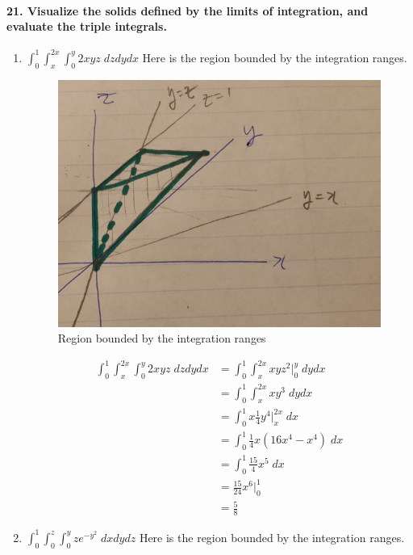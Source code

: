 \documentclass{article}
\begin{document}
\paragraph{21. Visualize the solids defined by the limits of integration, and evaluate the triple integrals.}
    \begin{enumerate}
        \item $\int_0^1 \int_x^{2x} \int_0^y 2xyz \; dz dy dx$
        \newline Here is the region bounded by the integration ranges.
        
        
        \begin{figure}[H]
            \centering
            \includegraphics[width=0.75\columnwidth]{num21_1.JPG}
            \caption{Region bounded by the integration ranges}
            \label{fig:my_label}
        \end{figure}
\begin{align*}
    \int_0^1 \int_x^{2x} \int_0^y 2xyz \; dz dy dx &= \int_0^1 \int_x^{2x} xyz^2 \Bigr|_{0}^{y} \; dy dx \\
    &= \int_0^1 \int_x^{2x} xy^3 \; dy dx \\
    &= \int_0^1 x\frac{1}{4}y^4 \Bigr|_{x}^{2x} \; dx \\
    &= \int_0^1 \frac{1}{4}x(16x^4-x^4) \; dx\\
    &= \int_0^1 \frac{15}{4}x^5 \; dx\\
    &= \frac{15}{24}x^6 \Bigr|_{0}^{1}\\
    &= \frac{5}{8}
\end{align*}
        
        
        \item $\int_0^1 \int_0^z \int_0^y z e^{-y^2} \; dx dy dz$
        \newline Here is the region bounded by the integration ranges.
        

\end{enumerate}
\end{document}

